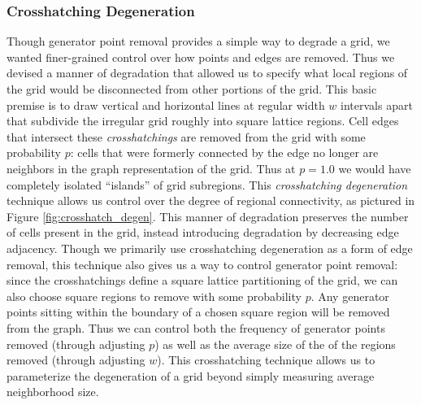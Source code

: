 \documentclass[a4paper,11pt]{article}
\begin{document}
\subsubsection{Crosshatching Degeneration}
\label{subsec:ch_degen}
Though generator point removal provides a simple way to degrade a grid, we wanted finer-grained control over how points and edges are removed. Thus we devised a manner of degradation that allowed us to specify what local regions of the grid would be disconnected from other portions of the grid. This basic premise is to draw vertical and horizontal lines at regular width $w$ intervals apart that subdivide the irregular grid roughly into square lattice regions. Cell edges that intersect these \textit{crosshatchings} are removed from the grid with some probability $p$: cells that were formerly connected by the edge no longer are neighbors in the graph representation of the grid. Thus at $p=1.0$ we would have completely isolated ``islands'' of grid subregions. This \textit{crosshatching degeneration} technique allows us control over the degree of regional connectivity, as pictured in Figure \ref{fig:crosshatch_degen}. This manner of degradation preserves the number of cells present in the grid, instead introducing degradation by decreasing edge adjacency. Though we primarily use crosshatching degeneration as a form of edge removal, this technique also gives us a way to control generator point removal: since the crosshatchings define a square lattice partitioning of the grid, we can also choose square regions to remove with some probability $p$. Any generator points sitting within the boundary of a chosen square region will be removed from the graph. Thus we can control both the frequency of generator points removed (through adjusting $p$) as well as the average size of the of the regions removed (through adjusting $w$). This crosshatching technique allows us to parameterize the degeneration of a grid beyond simply measuring average neighborhood size.
\end{document}
